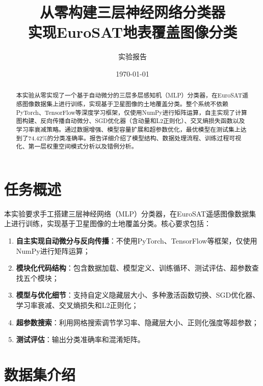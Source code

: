 \documentclass[12pt,a4paper]{article}
\title{\textbf{从零构建三层神经网络分类器\\实现EuroSAT地表覆盖图像分类}}
\author{实验报告}
\date{\today}
\begin{document}
\maketitle
\thispagestyle{empty}

\begin{abstract}
本实验从零实现了一个基于自动微分的三层多层感知机（MLP）分类器，在EuroSAT遥感图像数据集上进行训练，实现基于卫星图像的土地覆盖分类。整个系统不依赖PyTorch、TensorFlow等深度学习框架，仅使用NumPy进行矩阵运算，自主实现了计算图构建、反向传播自动微分、SGD优化器（含动量和L2正则化）、交叉熵损失函数以及学习率衰减策略。通过数据增强、模型容量扩展和超参数优化，最优模型在测试集上达到了74.42\%的分类准确率。报告详细介绍了模型结构、数据处理流程、训练过程可视化、第一层权重空间模式分析以及错例分析。
\end{abstract}

\tableofcontents
\newpage

\section{任务概述}

本实验要求手工搭建三层神经网络（MLP）分类器，在EuroSAT遥感图像数据集上进行训练，实现基于卫星图像的土地覆盖分类。核心要求包括：

\begin{enumerate}[leftmargin=2em]
    \item \textbf{自主实现自动微分与反向传播}：不使用PyTorch、TensorFlow等框架，仅使用NumPy进行矩阵运算；
    \item \textbf{模块化代码结构}：包含数据加载、模型定义、训练循环、测试评估、超参数查找五个模块；
    \item \textbf{模型与优化细节}：支持自定义隐藏层大小、多种激活函数切换、SGD优化器、学习率衰减、交叉熵损失和L2正则化；
    \item \textbf{超参数搜索}：利用网格搜索调节学习率、隐藏层大小、正则化强度等超参数；
    \item \textbf{测试评估}：输出分类准确率和混淆矩阵。
\end{enumerate}

\section{数据集介绍}
\end{document}
